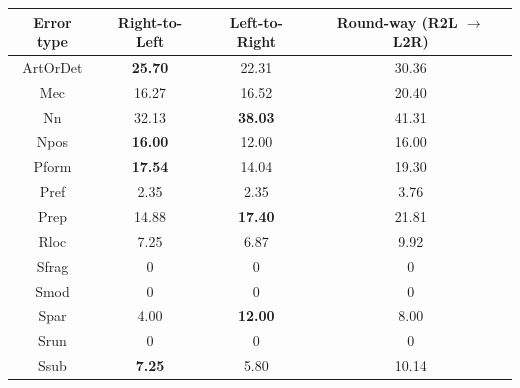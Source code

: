 \documentclass{article} %
\begin{document}
\begin{table}[t]
\small
\centering
\begin{tabular}{c|c|c|c}
\hline
\textbf{Error type} & \textbf{Right-to-Left} & \textbf{Left-to-Right} & \textbf{Round-way (R2L $\to$ L2R)} \\ \hline
ArtOrDet            & \textbf{25.70}         & 22.31                  & 30.36                                                          \\
Mec                 & 16.27                  & 16.52                  & 20.40                                                          \\
Nn                  & 32.13                  & \textbf{38.03}         & 41.31                                                          \\
Npos                & \textbf{16.00}         & 12.00                  & 16.00                                                          \\
Pform               & \textbf{17.54}         & 14.04                  & 19.30                                                          \\
Pref                & 2.35                   & 2.35                   & 3.76                                                           \\
Prep                & 14.88                  & \textbf{17.40}         & 21.81                                                          \\
Rloc                & 7.25                   & 6.87                   & 9.92                                                           \\
Sfrag               & 0                      & 0                      & 0                                                              \\
Smod                & 0                      & 0                      & 0                                                              \\
Spar                & 4.00                   & \textbf{12.00}         & 8.00                                                           \\
Srun                & 0                      & 0                      & 0                                                              \\
Ssub                & \textbf{7.25}          & 5.80                   & 10.14                                                          \\

\end{tabular}
\end{table}
\end{document}
